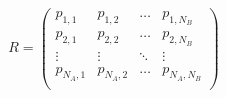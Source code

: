 \begin{frame}
    \begin{equation*}
        R = 
        \begin{pmatrix}
            p_{1,1} & p_{1,2} & \dots & p_{1,N_B} \\ 
            p_{2,1} & p_{2,2} & \dots & p_{2,N_B} \\
            \vdots & \vdots & \ddots & \vdots \\
            p_{N_A,1} & p_{N_A,2} & \dots & p_{N_A,N_B} \\
        \end{pmatrix}
    \end{equation*}

\end{frame}